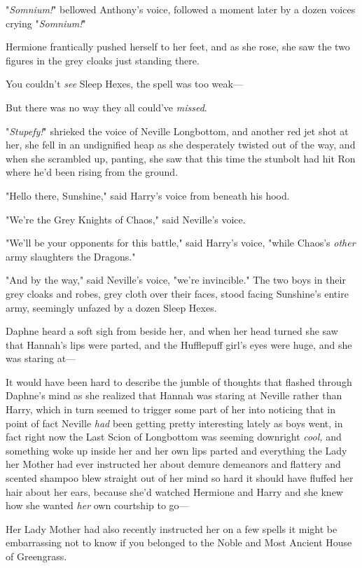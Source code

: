 "\emph{Somnium!}" bellowed Anthony's voice, followed a moment later by a dozen
voices crying "\emph{Somnium!}"

Hermione frantically pushed herself to her feet, and as she rose, she saw the
two figures in the grey cloaks just standing there.

You couldn't \emph{see} Sleep Hexes, the spell was too weak—

But there was no way they all could've \emph{missed}.

"\emph{Stupefy!}" shrieked the voice of Neville Longbottom, and another red jet
shot at her, she fell in an undignified heap as she desperately twisted out of
the way, and when she scrambled up, panting, she saw that this time the
stunbolt had hit Ron where he'd been rising from the ground.

"Hello there, Sunshine," said Harry's voice from beneath his hood.

"We're the Grey Knights of Chaos," said Neville's voice.

"We'll be your opponents for this battle," said Harry's voice, "while Chaos's
\emph{other} army slaughters the Dragons."

"And by the way," said Neville's voice, "we're invincible."
\later
The two boys in their grey cloaks and robes, grey cloth over their faces, stood
facing Sunshine's entire army, seemingly unfazed by a dozen Sleep Hexes.

Daphne heard a soft sigh from beside her, and when her head turned she saw that
Hannah's lips were parted, and the Hufflepuff girl's eyes were huge, and she
was staring at—

It would have been hard to describe the jumble of thoughts that flashed through
Daphne's mind as she realized that Hannah was staring at Neville rather than
Harry, which in turn seemed to trigger some part of her into noticing that in
point of fact Neville \emph{had} been getting pretty interesting lately as boys
went, in fact right now the Last Scion of Longbottom was seeming downright
\emph{cool,} and something woke up inside her and her own lips parted and
everything the Lady her Mother had ever instructed her about demure demeanors
and flattery and scented shampoo blew straight out of her mind so hard it
should have fluffed her hair about her ears, because she'd watched Hermione and
Harry and she knew how she wanted \emph{her} own courtship to go—

Her Lady Mother had also recently instructed her on a few spells it might be
embarrassing not to know if you belonged to the Noble and Most Ancient House of
Greengrass.

